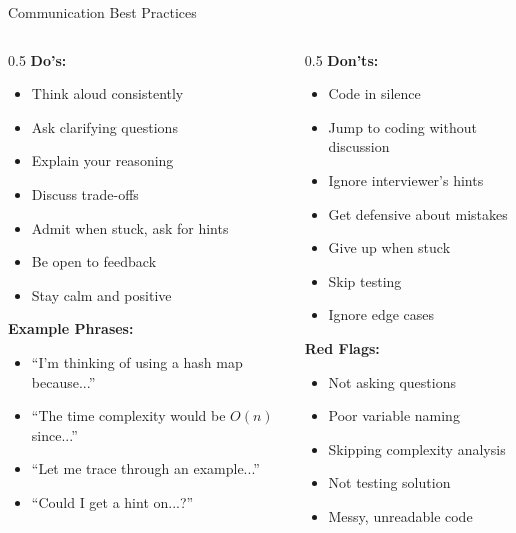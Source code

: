 \documentclass[aspectratio=169,xcolor=dvipsnames]{beamer}
\begin{document}
\begin{frame}{Communication Best Practices}
  \begin{columns}
    \begin{column}{0.5\textwidth}
      \textbf{Do's:}
      \begin{itemize}
        \item Think aloud consistently
        \item Ask clarifying questions
        \item Explain your reasoning
        \item Discuss trade-offs
        \item Admit when stuck, ask for hints
        \item Be open to feedback
        \item Stay calm and positive
      \end{itemize}

      \vspace{0.3cm}
      \textbf{Example Phrases:}
      \begin{itemize}
        \item ``I'm thinking of using a hash map because...''
        \item ``The time complexity would be $O(n)$ since...''
        \item ``Let me trace through an example...''
        \item ``Could I get a hint on...?''
      \end{itemize}
    \end{column}

    \begin{column}{0.5\textwidth}
      \textbf{Don'ts:}
      \begin{itemize}
        \item Code in silence
        \item Jump to coding without discussion
        \item Ignore interviewer's hints
        \item Get defensive about mistakes
        \item Give up when stuck
        \item Skip testing
        \item Ignore edge cases
      \end{itemize}

      \vspace{0.3cm}
      \textbf{Red Flags:}
      \begin{itemize}
        \item Not asking questions
        \item Poor variable naming
        \item Skipping complexity analysis
        \item Not testing solution
        \item Messy, unreadable code
      \end{itemize}
    \end{column}
  \end{columns}
\end{frame}
\end{document}
